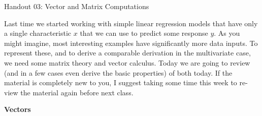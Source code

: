\documentclass[12pt,hidelinks]{article}
\numberwithin{equation}{section}
\begin{document}
{\LARGE Handout 03: Vector and Matrix Computations}

\vspace*{18pt}

Last time we started working with simple linear regression models that have
only a single characteristic $x$ that we can use to predict some response
$y$. As you might imagine, most interesting examples have significantly more
data inputs. To represent these, and to derive a comparable derivation in the
multivariate case, we need some matrix theory and vector calculus. Today we
are going to review (and in a few cases even derive the basic properties) of
both today. If the material is completely new to you, I suggest taking some
time this week to re-view the material again before next class.

\textbf{Vectors}
\end{document}
